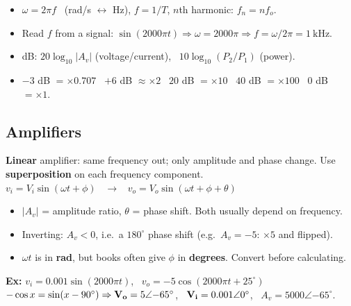     \begin{handy}
        \begin{itemize}
            \item $\omega = 2\pi f$ \ (rad/s $\leftrightarrow$ Hz), \quad $f = 1/T$, \quad $n$th harmonic: $f_n = n f_o$.
            \item Read $f$ from a signal: $\sin(2000\pi t) \Rightarrow \omega = 2000\pi \Rightarrow f = \omega/2\pi = \SI{1}{\kilo\hertz}$.
            \item dB: $20\log_{10}|A_v|$ (voltage/current), \ $10\log_{10}(P_2/P_1)$ (power).
            \item $-3$ dB $= \times0.707$ \ $+6$ dB $\approx \times2$ \ $20$ dB $= \times10$ \ $40$ dB $= \times100$ \ $0$ dB $= \times1$.
        \end{itemize}
    \end{handy}

    \subsection[1.7]{Amplifiers}
    \textbf{Linear} amplifier: same frequency out; only amplitude and phase change. Use \textbf{superposition} on each frequency component.\\
    $v_i = V_i\sin(\omega t+\phi)$ \ $\to$ \ $v_o = V_o\sin(\omega t+\phi+\theta)$
    \begin{itemize}
        \item $|A_v|$ = amplitude ratio, $\theta$ = phase shift. Both usually depend on frequency.
        \item Inverting: $A_v < 0$, i.e.\ a $180^\circ$ phase shift (e.g.\ $A_v = -5$: $\times5$ and flipped).
        \item $\omega t$ is in \textbf{rad}, but books often give $\phi$ in \textbf{degrees}. Convert before calculating.
    \end{itemize}
    \textbf{Ex:} $v_i = 0.001\sin(2000\pi t)$, \ $v_o = -5\cos(2000\pi t+25^\circ)$ \\
    $-\cos x = \sin(x-90^\circ) \Rightarrow \mathbf{V_o} = 5\angle{-65^\circ}$, \ $\mathbf{V_i} = 0.001\angle0^\circ$, \ $A_v = 5000\angle{-65^\circ}$.


